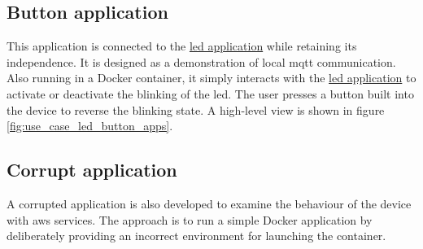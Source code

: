 \subsection{Button application}
\label{subsec:button_app}
This application is connected to the \hyperref[subsec:led_app]{led application} while retaining its independence. It is designed as a demonstration of local \acrshort{mqtt} communication. Also running in a Docker container, it simply interacts with the \hyperref[subsec:led_app]{led application} to activate or deactivate the blinking of the led. The user presses a button built into the device to reverse the blinking state. A high-level view is shown in figure \ref{fig:use_case_led_button_apps}.

\subsection{Corrupt application}
A corrupted application is also developed to examine the behaviour of the device with \gls{aws} services. The approach is to run a simple Docker application by deliberately providing an incorrect environment for launching the container.